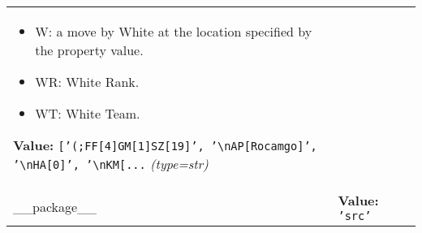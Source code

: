 \begin{longtable}{|p{\varnamewidth}|p{\vardescrwidth}|l}
\begin{itemize}
\item W: a move by White at the location specified by the property value.

\item WR: White Rank.

\item WT: White Team.

\end{itemize}

\textbf{Value:} 
{\tt \texttt{[}\texttt{'}\texttt{(;FF[4]GM[1]SZ[19]}\texttt{'}\texttt{, }\texttt{'}\texttt{{\textbackslash}nAP[Rocamgo]}\texttt{'}\texttt{, }\texttt{'}\texttt{{\textbackslash}nHA[0]}\texttt{'}\texttt{, }\texttt{'}\texttt{{\textbackslash}nKM[}\texttt{...}}            {\it (type=str)}&\\
\cline{1-2}
\raggedright \_\-\_\-p\-a\-c\-k\-a\-g\-e\-\_\-\_\- & \raggedright \textbf{Value:} 
{\tt \texttt{'}\texttt{src}\texttt{'}}&\\
\cline{1-2}
\end{longtable}

